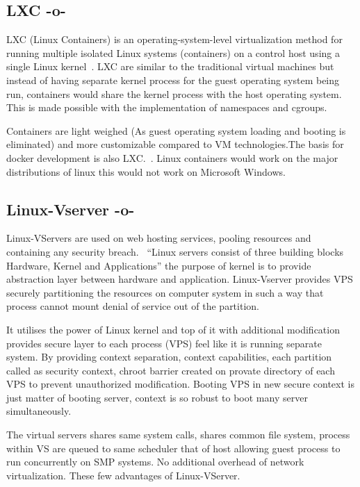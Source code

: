 \subsection{LXC -o-}
     
LXC (Linux Containers) is an operating-system-level virtualization
method for running multiple isolated Linux systems (containers) on a
control host using a single Linux kernel~\cite{www-wiki-lxc}. LXC are
similar to the traditional virtual machines but instead of having
separate kernel process for the guest operating system being run,
containers would share the kernel process with the host operating
system. This is made possible with the implementation of namespaces
and cgroups.~\cite{www-jpablo}

Containers are light weighed (As guest operating system loading and
booting is eliminated) and more customizable compared to VM
technologies.The basis for docker development is also
LXC.~\cite{www-infoworld}. Linux containers would work on the major
distributions of linux this would not work on Microsoft Windows.
	
\subsection{Linux-Vserver -o-}

Linux-VServers are used on web hosting services, pooling resources and
containing any security breach.~\cite{www-linux-vserver-org} ``Linux
servers consist of three building blocks Hardware, Kernel and
Applications'' the purpose of kernel is to provide abstraction layer
between hardware and application. Linux-Vserver provides VPS securely
partitioning the resources on computer system in such a way that
process cannot mount denial of service out of the partition.
     
     It utilises the power of Linux kernel and top of it with
     additional modification provides secure layer to each process
     (VPS) feel like it is running separate system.  By providing
     context separation, context capabilities, each partition called
     as security context, chroot barrier created on provate directory
     of each VPS to prevent unauthorized modification. Booting VPS in
     new secure context is just matter of booting server, context is
     so robust to boot many server simultaneously.
     
     The virtual servers shares same system calls, shares common file
     system, process within VS are queued to same scheduler that of
     host allowing guest process to run concurrently on SMP
     systems. No additional overhead of network virtualization.  These
     few advantages of Linux-VServer.

